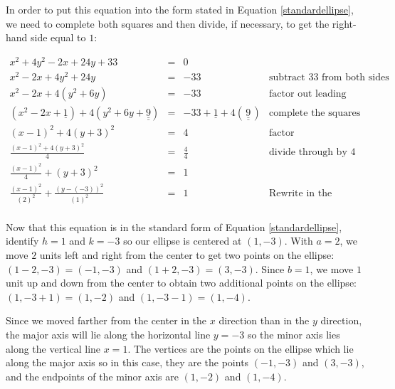 \documentclass{ximera}
\begin{document}
\begin{example}
\begin{enumerate}
\begin{enumerate}
 

In order to put this equation into the form stated in Equation \ref{standardellipse}, we need to complete both squares and then divide, if necessary, to get the right-hand side equal to $1$:

\[ \begin{array}{rclr} x^2+4y^2-2x+24y+33 & = & 0 & \\ 

x^2-2x+4y^2+24y & = & -33 & \text{subtract $33$ from both sides} \\   

x^2 - 2x + 4\left(y^2+6y\right)  &  = & - 33 &  \text{factor out leading coefficients} \\   

\left(x^2 - 2x +\underline{1}\right) + 4\left(y^2+6y+\underline{\underline{9}}\right)  &  = & - 33 + \underline{1} + 4(\, \underline{\underline{9}} \, )& \text{complete the squares} \\ 

(x-1)^2 + 4(y+3)^2  &  = & 4 & \text{factor}  \\   

\frac{(x-1)^2 + 4(y+3)^2}{4}  &  = & \frac{4}{4} & \text{divide through by $4$} \\ 

 \frac{(x-1)^2}{4} + (y+3)^2 & = & 1 & \\  
 
 \frac{(x-1)^2}{(2)^2} + \frac{(y-(-3))^2}{(1)^2} & = & 1 &  \text{Rewrite in the desired form.} \\  \end{array} \]

Now that this equation is in the standard form of Equation \ref{standardellipse}, identify $h = 1$ and  $k = -3$ so our ellipse is centered at $(1,-3)$.  With $a=2$,  we move $2$ units left and right from the center to get two points on the ellipse:  $(1-2,-3) = (-1,-3)$ and $(1+2, -3) = (3,-3)$.  Since $b=1$, we move $1$ unit up and down from the center to obtain two additional points on the ellipse:  $(1,-3+1) = (1,-2)$ and $(1,-3-1) = (1,-4)$.  

 

 Since we moved farther from the center in the $x$ direction than in the $y$ direction, the major axis will lie along the horizontal line $y=-3$ so the minor axis lies along the vertical line $x = 1$. The vertices are the points on the ellipse which lie along the major axis so in this case, they are the points $(-1,-3)$ and $(3,-3)$, and the endpoints of the minor axis are $(1,-2)$ and $(1,-4)$. 
 

\end{enumerate}
\end{enumerate}
\end{example}
\end{document}
